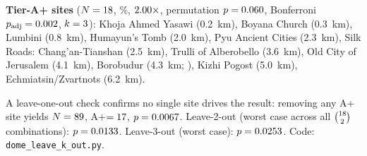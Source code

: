 \documentclass[12pt,a4paper]{article}
\begin{document}
\begin{table}[H]
\centering
\caption{UNESCO domed/spherical monument test ($N = \NcircTotal$, raw keyword sweep).
  Primary evidence against the chance explanation: simulation permutation
  $Z = \simDomePermZ$, $p = \simDomePermP$ (\S\ref{sec:simulation_null}).
  Exact binomial results are reference baselines assuming uniform longitude
  spacing. The non-significant $\chi^2$ is discussed in the text.}
\label{tab:circularstats}
\end{table}

\noindent\textbf{Tier-A+ sites} ($N = 18$, \NcircApRate\%, $2.00\times$,
permutation $p = \simDomePermP$,
Bonferroni $p_\mathrm{adj} = 0.002$, $k = 3$):
Khoja Ahmed Yasawi (0.2~km),
Boyana Church (0.3~km),
Lumbini (0.8~km),
Humayun's Tomb (2.0~km),
Pyu Ancient Cities (2.3~km),
Silk Roads: Chang'an-Tianshan (2.5~km), Trulli of Alberobello (3.6~km),
Old City of Jerusalem (4.1~km),
Borobudur (4.3~km; \citealt{miksic1990borobudur}),
Kizhi Pogost (5.0~km), Echmiatsin/Zvartnots (6.2~km).

A leave-one-out check confirms no single site drives the result:
removing any A+ site yields $N = 89$, A+$= 17$,
$p = 0.0067$.
Leave-2-out (worst case across all $\binom{18}{2}$ combinations):
$p = 0.0133$.
Leave-3-out (worst case): $p = 0.0253$.
Code: \texttt{dome\_leave\_k\_out.py}.
\end{document}
